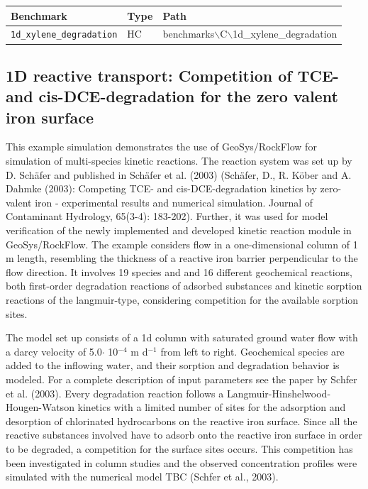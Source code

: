 \begin{table}[htbp]
\centering
\begin{tabular}{|l|l|l|}
\hline
Benchmark & Type & Path \\
\hline
\texttt{1d\_xylene\_degradation}& HC &  benchmarks$\backslash$C$\backslash$1d\_xylene\_degradation  \\			
\hline
\end{tabular}
\end{table}




\subsection[Competition of TCE- and cis-DCE-degradation for zero valent iron surface (1D)]{1D reactive transport: Competition of TCE- and cis-DCE-degradation for the zero valent iron surface}
\label{l_s_benchmark_1d_TCEonIon}

This example simulation demonstrates the use of GeoSys/RockFlow for simulation of multi-species kinetic reactions. The reaction system was set up by D. Schäfer and published in Schäfer et al. (2003) (Schäfer, D., R. Köber and A. Dahmke (2003): Competing TCE- and cis-DCE-degradation kinetics by zero-valent iron - experimental results and numerical simulation. Journal of Contaminant Hydrology, 65(3-4): 183-202). Further, it was used for model verification of the newly implemented and developed kinetic reaction module in GeoSys/RockFlow. The example considers flow in a one-dimensional column of 1 m length, resembling the thickness of a reactive iron barrier perpendicular to the flow direction. It involves 19 species and and 16 different geochemical reactions, both first-order degradation reactions of adsorbed substances and kinetic sorption reactions of the langmuir-type, considering competition for the available sorption sites.

The model set up consists of a 1d column with saturated ground water flow with a darcy velocity of 5.0$\cdot$ 10$^{-4}$ m d$^{-1}$ from left to right. Geochemical species are added to the inflowing water, and their sorption and degradation behavior is modeled. For a complete description of input parameters see the paper by Schfer et al. (2003). Every degradation reaction follows a Langmuir-Hinshelwood-Hougen-Watson kinetics with a limited number of sites for the adsorption and desorption of chlorinated hydrocarbons on the reactive iron surface. Since all the reactive substances involved have to adsorb onto the reactive iron surface in order to be degraded, a competition for the surface sites occurs. This competition has been investigated in column studies and the observed concentration profiles were simulated with the numerical model TBC (Schfer et al., 2003).




